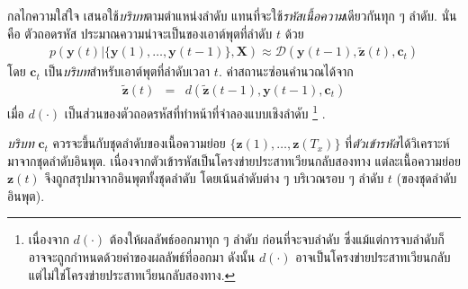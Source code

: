 กลไกความใส่ใจ เสนอใช้\textit{บริบท}ตามตำแหน่งลำดับ แทนที่จะใช้\textit{รหัสเนื้อความ}เดียวกันทุก ๆ ลำดับ.
นั่นคือ
ตัวถอดรหัส
ประมาณความน่าจะเป็นของเอาต์พุตที่ลำดับ $t$ 
ด้วย 
\begin{eqnarray}
p\left(\bm{y}(t) | \{\bm{y}(1), \ldots, \bm{y}(t-1)\}, \bm{X}\right) \approx \mathcal{D}\left(\bm{y}(t-1), \tilde{\bm{z}}(t), \bm{c}_t\right)
\label{eq: attention decoding context}
\end{eqnarray}
โดย $\bm{c}_t$ เป็น\textit{บริบท}สำหรับเอาต์พุตที่ลำดับเวลา $t$.
ค่าสถานะซ่อนคำนวณได้จาก
\begin{eqnarray}
\tilde{\bm{z}}(t) &=& d(\tilde{\bm{z}}(t-1), \bm{y}(t-1), \bm{c}_t)
\label{eq: attention decoder z}
\end{eqnarray}
เมื่อ $d(\cdot)$ เป็นส่วนของตัวถอดรหัสที่ทำหน้าที่จำลองแบบเชิงลำดับ%
\footnote{%
เนื่องจาก $d(\cdot)$ ต้องให้ผลลัพธ์ออกมาทุก ๆ ลำดับ ก่อนที่จะจบลำดับ ซึ่งแม้แต่การจบลำดับก็อาจจะถูกกำหนดด้วยค่าของผลลัพธ์ที่ออกมา
ดังนั้น $d(\cdot)$ อาจเป็นโครงข่ายประสาทเวียนกลับ แต่ไม่ใช่โครงข่ายประสาทเวียนกลับสองทาง.
}%
.

\textit{บริบท} $\bm{c}_t$ ควรจะขึ้นกับชุดลำดับของเนื้อความย่อย $\{\bm{z}(1), \ldots, \bm{z}(T_x)\}$
ที่\textit{ตัวเข้ารหัส}ได้วิเคราะห์มาจากชุดลำดับอินพุต.
เนื่องจากตัวเข้ารหัสเป็นโครงข่ายประสาทเวียนกลับสองทาง
แต่ละเนื้อความย่อย $\bm{z}(t)$ 
จึงถูกสรุปมาจากอินพุตทั้งชุดลำดับ
โดยเน้นลำดับต่าง ๆ บริเวณรอบ ๆ ลำดับ $t$ (ของชุดลำดับอินพุต). 

